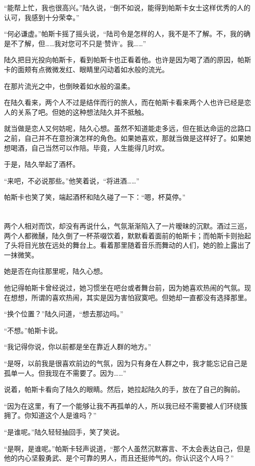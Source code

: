 “能帮上忙，我也很高兴。”陆久说，“倒不如说，能得到帕斯卡女士这样优秀的人的认可，我感到十分荣幸。”

“何必谦虚。”帕斯卡摇了摇头说，“陆司令是怎样的人，我不是不了解。不，我的确是不了解，但……我对您可不只是‘赞许’。我……”

陆久把目光投向帕斯卡，看到帕斯卡也正看着他。也许是因为喝了酒的原因，帕斯卡的面颊有点微微发红、眼睛里闪动着如水般的流光。

在那片流光之中，也倒映着如水般的温柔。

在陆久看来，两个人不过是结伴而行的旅人，而在帕斯卡看来两个人也许已经是恋人的关系了吧。但她的这种想法陆久并不抵触。

就当做是恋人又何妨呢，陆久心想。虽然不知道能走多远，但在抵达命运的岔路口之前，自己并不在意扮演怎样的角色。如果她喜欢，那就当做是这样好了。如果她想喝酒，自己当然可以作陪。毕竟，人生能得几时欢。

于是，陆久举起了酒杯。

“来吧，不必说那些。”他笑着说，“将进酒……”

帕斯卡也笑了笑，端起酒杯和陆久碰了一下：“嗯，杯莫停。”\section*{}

两个人相对而饮，却没有再说什么，气氛渐渐陷入了一片暧昧的沉默。酒过三巡，两个人都微醺，陆久倒了一杯茶啜饮着，默默看着面前的帕斯卡；而帕斯卡则抬起了头将目光放在远处的舞台上。看着那里随着音乐而舞动的人们，她的脸上露出了一抹微笑。

她是否在向往那里呢，陆久心想。

他记得帕斯卡曾经说过，她习惯坐在吧台或者舞台前，因为她喜欢热闹的气氛。现在想想，所谓的喜欢热闹，其实是因为害怕寂寞吧。但她却一直都没有选择那里。

“换个位置？”陆久问道，“想去那边吗。”

“不想。”帕斯卡说。

“我记得你说，你以前都是坐在靠近人群的地方。”

“是呀，以前我是很喜欢前边的气氛，因为只有身在人群之中，我才能忘记自己是孤单一人。但我现在不需要了。因为……”

说着，帕斯卡看向了陆久的眼睛。然后，她拉起陆久的手，放在了自己的胸前。

“因为在这里，有了一个能够让我不再孤单的人，所以我已经不需要被人们环绕簇拥了。你知道这个人是谁吗？”

“是谁呢。”陆久轻轻抽回手，笑了笑说。

“是啊，是谁呢。”帕斯卡轻声说道，“那个人虽然沉默寡言、不太会表达自己，但是他的内心坚毅勇武、是个可靠的男人，而且还挺帅气的。你认识这个人吗？”

